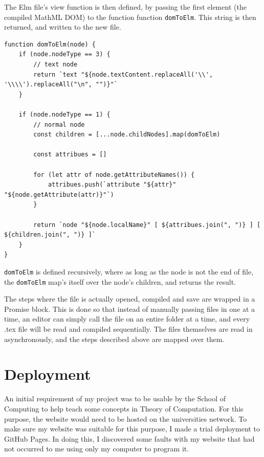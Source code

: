 \documentclass{l4proj}
\begin{document}
The Elm file's view function is then defined, by passing the first element (the compiled MathML DOM) to the function function \texttt{domToElm}.  This string is then returned, and written to the new file.

\begin{lstlisting}
function domToElm(node) {
    if (node.nodeType == 3) {
        // text node
        return `text "${node.textContent.replaceAll('\\', '\\\\').replaceAll("\n", "")}"`
    }

    if (node.nodeType == 1) {
        // normal node
        const children = [...node.childNodes].map(domToElm)

        const attribues = []

        for (let attr of node.getAttributeNames()) {
            attribues.push(`attribute "${attr}" "${node.getAttribute(attr)}"`)
        }

        return `node "${node.localName}" [ ${attribues.join(", ")} ] [ ${children.join(", ")} ]`
    }
}
\end{lstlisting}

\texttt{domToElm} is defined recursively, where as long as the node is not the end of file, the \texttt{domToElm} map's itself over the node's children, and returns the result.

The steps where the file is actually opened, compiled and save are wrapped in a Promise block. This is done so that instead of manually passing files in one at a time, an editor can simply call the file on an entire folder at a time, and every .tex file will be read and compiled sequentially.  The files themselves are read in asynchronously, and the steps described above are mapped over them.

\section{Deployment}

An initial requirement of my project was to be usable by the School of Computing to help teach some concepts in Theory of Computation.  For this purpose, the website would need to be hosted on the universities network.  To make sure my website was suitable for this purpose, I made a trial deployment to GitHub Pages.  In doing this, I discovered some faults with my website that had not occurred to me using only my computer to program it.
\end{document}
